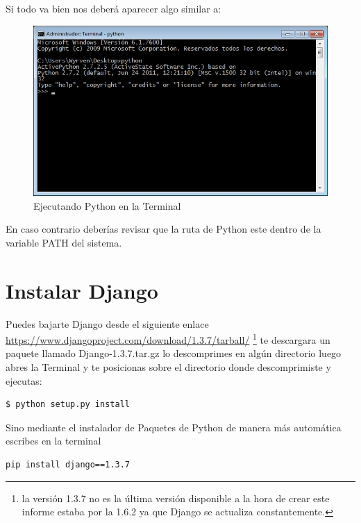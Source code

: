 Si todo va bien nos deberá aparecer algo similar a:

\begin{figure}[h]
    \centering
    \includegraphics[scale=0.7]{resourse/consola-python.jpg}
    \caption{Ejecutando Python en la Terminal}
    \label{fig:01}
\end{figure}    

En caso contrario deberías revisar que la ruta de Python este dentro de la variable  PATH del sistema.


\section{Instalar Django}

Puedes bajarte Django desde el siguiente enlace \url{https://www.djangoproject.com/download/1.3.7/tarball/}
\footnote {la versión 1.3.7 no es la última versión disponible a la hora de crear este informe estaba por la 1.6.2 ya que Django se actualiza constantemente.} te descargara un paquete llamado Django-1.3.7.tar.gz lo descomprimes en algún directorio luego abres la Terminal y te posicionas sobre el directorio donde descomprimiste y ejecutas:

\begin{lstlisting}[style=consola]
    $ python setup.py install 
\end{lstlisting}
\vspace{0.1cm}

Sino mediante el instalador de Paquetes de Python de manera más automática escribes en la terminal

\begin{lstlisting}[style=consola]
     pip install django==1.3.7
\end{lstlisting}
\vspace{0.1cm}

